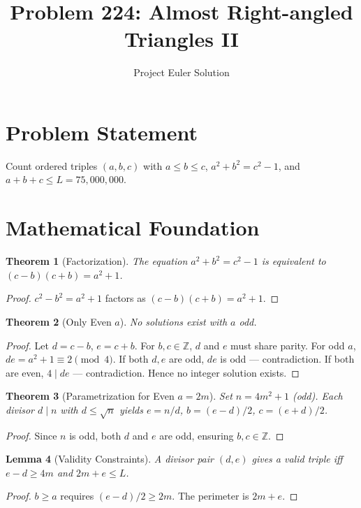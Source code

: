 \documentclass[12pt]{article}
\title{Problem 224: Almost Right-angled Triangles II}
\author{Project Euler Solution}
\date{}
\newtheorem{theorem}{Theorem}
\newtheorem{lemma}[theorem]{Lemma}
\begin{document}
\maketitle

\section{Problem Statement}
Count ordered triples $(a, b, c)$ with $a \leq b \leq c$, $a^2 + b^2 = c^2 - 1$, and $a + b + c \leq L = 75{,}000{,}000$.

\section{Mathematical Foundation}

\begin{theorem}[Factorization]
The equation $a^2 + b^2 = c^2 - 1$ is equivalent to $(c-b)(c+b) = a^2 + 1$.
\end{theorem}
\begin{proof}
$c^2 - b^2 = a^2 + 1$ factors as $(c-b)(c+b) = a^2 + 1$.
\end{proof}

\begin{theorem}[Only Even $a$]
No solutions exist with $a$ odd.
\end{theorem}
\begin{proof}
Let $d = c - b$, $e = c + b$. For $b, c \in \mathbb{Z}$, $d$ and $e$ must share parity. For odd $a$, $de = a^2 + 1 \equiv 2 \pmod{4}$. If both $d, e$ are odd, $de$ is odd --- contradiction. If both are even, $4 \mid de$ --- contradiction. Hence no integer solution exists.
\end{proof}

\begin{theorem}[Parametrization for Even $a = 2m$]
Set $n = 4m^2 + 1$ (odd). Each divisor $d \mid n$ with $d \leq \sqrt{n}$ yields $e = n/d$, $b = (e-d)/2$, $c = (e+d)/2$.
\end{theorem}
\begin{proof}
Since $n$ is odd, both $d$ and $e$ are odd, ensuring $b, c \in \mathbb{Z}$.
\end{proof}

\begin{lemma}[Validity Constraints]
A divisor pair $(d, e)$ gives a valid triple iff $e - d \geq 4m$ and $2m + e \leq L$.
\end{lemma}
\begin{proof}
$b \geq a$ requires $(e-d)/2 \geq 2m$. The perimeter is $2m + e$.
\end{proof}
\end{document}
